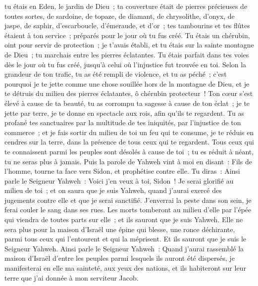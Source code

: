 \begin{multicols}{2}
tu étais en Eden, le jardin de Dieu~; ta couverture était de pierres précieuses de toutes sortes, de sardoine, de topaze, de diamant, de chrysolithe, d'onyx, de jaspe, de saphir, d'escarboucle, d'émeraude, et d'or~; tes tambourins et tes flûtes étaient à ton service~; préparés pour le jour où tu fus créé.
Tu étais un chérubin, oint pour servir de protection~; je t'avais établi, et tu étais sur la sainte montagne de Dieu~; tu marchais entre les pierres éclatantes.
Tu étais parfait dans tes voies dès le jour où tu fus créé, jusqu'à celui où l'injustice fut trouvée en toi.
Selon la grandeur de ton trafic, tu as été rempli de violence, et tu as péché~; c'est pourquoi je te jette comme une chose souillée hors de la montagne de Dieu, et je te détruis du milieu des pierres éclatantes, ô chérubin protecteur~!
Ton cœur s'est élevé à cause de ta beauté, tu as corrompu ta sagesse à cause de ton éclat~; je te jette par terre, je te donne en spectacle aux rois, afin qu'ils te regardent.
Tu as profané tes sanctuaires par la multitude de tes iniquités, par l'injustice de ton commerce~; et je fais sortir du milieu de toi un feu qui te consume, je te réduis en cendres sur la terre, dans la présence de tous ceux qui te regardent.
Tous ceux qui te connaissent parmi les peuples sont désolés à cause de toi~; tu es réduit à néant, tu ne seras plus à jamais.
Puis la parole de Yahweh vint à moi en disant~:
Fils de l'homme, tourne ta face vers Sidon, et prophétise contre elle.
Tu diras~: Ainsi parle le Seigneur Yahweh~: Voici j'en veux à toi, Sidon~! Je serai glorifié au milieu de toi~; et on saura que je suis Yahweh, quand j'aurai exercé des jugements contre elle et que je serai sanctifié.
J'enverrai la peste dans son sein, je ferai couler le sang dans ses rues. Les morts tomberont au milieu d'elle par l'épée qui viendra de toutes parts sur elle~; et ils sauront que je suis Yahweh.
Elle ne sera plus pour la maison d'Israël une épine qui blesse, une ronce déchirante, parmi tous ceux qui l'entourent et qui la méprisent. Et ils sauront que je suis le Seigneur Yahweh.
Ainsi parle le Seigneur Yahweh~: Quand j'aurai rassemblé la maison d'Israël d'entre les peuples parmi lesquels ils auront été dispersés, je manifesterai en elle ma sainteté, aux yeux des nations, et ils habiteront sur leur terre que j'ai donnée à mon serviteur Jacob.

\end{multicols}
